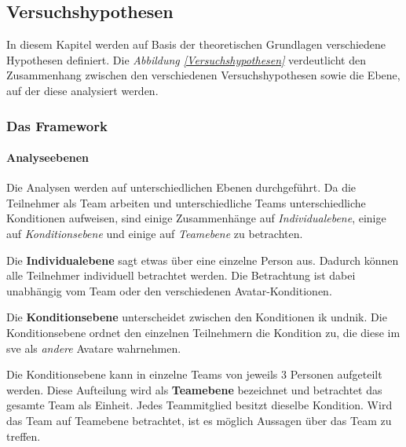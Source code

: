 \documentclass[a4paper,11pt]{article}%
\renewcommand{\\}{\vspace*{0.5\baselineskip} \newline}
\begin{document}
\subsection{Versuchshypothesen}
In diesem Kapitel werden auf Basis der theoretischen Grundlagen verschiedene Hypothesen definiert.
Die \textit{Abbildung \ref{Versuchshypothesen}} verdeutlicht den Zusammenhang zwischen den verschiedenen Versuchshypothesen sowie die Ebene, auf der diese analysiert werden.
\subsubsection{Das Framework}

\paragraph{Analyseebenen}
Die Analysen werden auf unterschiedlichen Ebenen durchgeführt.
Da die Teilnehmer als Team arbeiten und unterschiedliche Teams unterschiedliche Konditionen aufweisen, sind einige Zusammenhänge auf \textit{Individualebene}, einige auf \textit{Konditionsebene} und einige auf \textit{Teamebene} zu betrachten.

Die \textbf{Individualebene} sagt etwas über eine einzelne Person aus. Dadurch können alle Teilnehmer individuell betrachtet werden. Die Betrachtung ist dabei unabhängig vom Team oder den verschiedenen Avatar-Konditionen. 

Die \textbf{Konditionsebene} unterscheidet zwischen den Konditionen \ac{ik} und\newline \ac{nik}. Die Konditionsebene ordnet den einzelnen Teilnehmern die Kondition zu, die diese im \ac{sve} als \textit{andere} Avatare wahrnehmen. 

Die Konditionsebene kann in einzelne Teams von jeweils 3 Personen aufgeteilt werden. Diese Aufteilung wird als \textbf{Teamebene} bezeichnet und betrachtet das gesamte Team als Einheit. Jedes Teammitglied besitzt dieselbe Kondition. Wird das Team auf Teamebene betrachtet, ist es möglich Aussagen über das Team zu treffen. 
\end{document}
